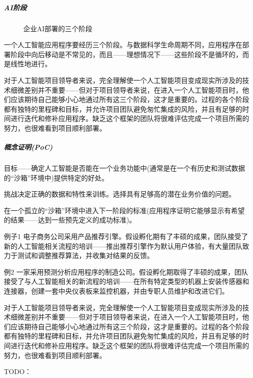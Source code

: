 \documentclass[letterpaper,11pt,english]{sphinxmanual}
\begin{document}
\subparagraph{AI阶段}
\label{\detokenize{chapter_knowledge/project_manage:id17}}
\begin{figure}[H]
\centering
\capstart

\noindent{}
\caption{企业AI部署的三个阶段}\label{\detokenize{chapter_knowledge/project_manage:id23}}\end{figure}

一个人工智能应用程序要经历三个阶段。与数据科学生命周期不同，应用程序在部署阶段中向后移动是不常见的，而且——理想情况下——这些阶段不是循环的，而是线性地进行。

对于人工智能项目领导者来说，完全理解使一个人工智能项目变成现实所涉及的技术细微差别并不重要——但对于项目领导者来说，在进入一个人工智能项目时，他们应该期待自己能够小心地通过所有这三个阶段，这才是重要的。过程的各个阶段都有独特的里程碑和目标，并允许项目团队避免匆忙集成的风险，并且有足够的时间进行迭代和修补应用程序。缺乏这个框架的团队将很难评估完成一个项目所需的努力，也很难看到项目顺利部署。


\subparagraph{概念证明(PoC)}
\label{\detokenize{chapter_knowledge/project_manage:poc}}
目标——确定人工智能是否能在一个业务功能中(通常是在一个有历史和测试数据的“沙箱”环境中)提供特定的好处。

挑战\sphinxhyphen{}决定正确的数据和特性来训练。选择具有足够高的潜在业务价值的问题。

在一个孤立的“沙箱”环境中进入下一阶段的标准(应用程序证明它能够显示有希望的结果——达到一些预先定义的成功标准)。

例子1
\sphinxhyphen{}电子商务公司采用产品推荐引擎。假设孵化期有了丰硕的成果，团队接受了新的人工智能相关流程的培训——推出推荐引擎作为默认用户体验，有大量团队致力于测试和调整推荐算法，并收集对结果的反馈。

例2
\sphinxhyphen{}一家采用预测分析应用程序的制造公司。假设孵化期取得了丰硕的成果，团队接受了与人工智能相关的新流程的培训——在所有特定类型的机器上安装传感器和连接器，创建一套中央仪表板来监控机器，并由专职人员维护和改进它们。

对于人工智能项目领导者来说，完全理解使一个人工智能项目变成现实所涉及的技术细微差别并不重要——但对于项目领导者来说，在进入一个人工智能项目时，他们应该期待自己能够小心地通过所有这三个阶段，这才是重要的。过程的各个阶段都有独特的里程碑和目标，并允许项目团队避免匆忙集成的风险，并且有足够的时间进行迭代和修补应用程序。缺乏这个框架的团队将很难评估完成一个项目所需的努力，也很难看到项目顺利部署。

TODO：
\end{document}
